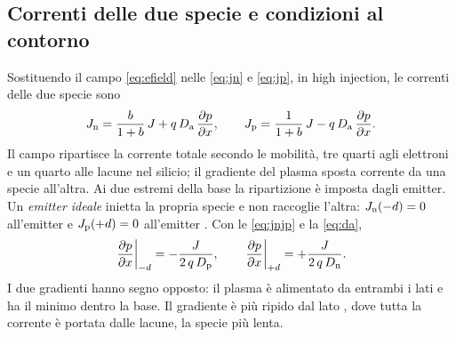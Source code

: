 \documentclass[10pt,a4paper]{scrartcl}
\let\newcommand\pdvaluedefine
\newcommand{\Da}{D_\mathrm{a}}
\newcommand{\Dn}{D_\mathrm{n}}
\newcommand{\Dp}{D_\mathrm{p}}
\newcommand{\Jn}{J_\mathrm{n}}
\newcommand{\Jp}{J_\mathrm{p}}
\newcommand{\Pp}{p\textsuperscript{+}}
\newcommand{\Np}{n\textsuperscript{+}}
\newcommand{\dpar}[2]{\frac{\partial #1}{\partial #2}}
\begin{document}
\subsection{Correnti delle due specie e condizioni al contorno}
\label{sec:boundary}
Sostituendo il campo \eqref{eq:efield} nelle \eqref{eq:jn} e \eqref{eq:jp}, in high injection, le correnti delle due specie sono
\begin{equation}
\Jn = \frac{b}{1+b}\,J + q\,\Da\,\dpar{p}{x} , \qquad \Jp = \frac{1}{1+b}\,J - q\,\Da\,\dpar{p}{x} .
\label{eq:jnjp}
\end{equation}
Il campo ripartisce la corrente totale secondo le mobilità, tre quarti agli elettroni e un quarto alle lacune nel silicio; il gradiente del plasma sposta corrente da una specie all'altra. Ai due estremi della base la ripartizione è imposta dagli emitter. Un \emph{emitter ideale} inietta la propria specie e non raccoglie l'altra: $\Jn(-d) = 0$ all'emitter \Pp{} e $\Jp(+d) = 0$ all'emitter \Np. Con le \eqref{eq:jnjp} e la \eqref{eq:da},
\begin{equation}
\left.\dpar{p}{x}\right|_{-d} = -\frac{J}{2\,q\,\Dp} , \qquad \left.\dpar{p}{x}\right|_{+d} = +\frac{J}{2\,q\,\Dn} .
\label{eq:bc}
\end{equation}
I due gradienti hanno segno opposto: il plasma è alimentato da entrambi i lati e ha il minimo dentro la base. Il gradiente è più ripido dal lato \Pp, dove tutta la corrente è portata dalle lacune, la specie più lenta.
\end{document}
